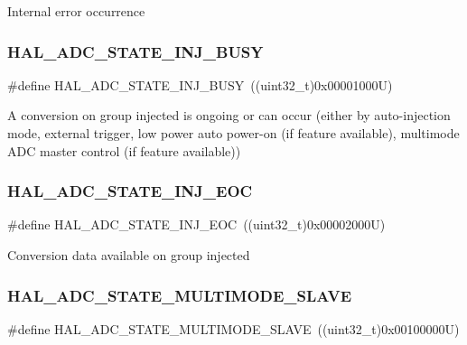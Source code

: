 Internal error occurrence \mbox{\label{group___a_d_c___exported___types_ga0044d240de80a70923b5c970d19ba24b}} 
\subsubsection{\texorpdfstring{HAL\_ADC\_STATE\_INJ\_BUSY}{HAL\_ADC\_STATE\_INJ\_BUSY}}
{\footnotesize\ttfamily \#define H\+A\+L\+\_\+\+A\+D\+C\+\_\+\+S\+T\+A\+T\+E\+\_\+\+I\+N\+J\+\_\+\+B\+U\+SY~((uint32\+\_\+t)0x00001000\+U)}

A conversion on group injected is ongoing or can occur (either by auto-\/injection mode, external trigger, low power auto power-\/on (if feature available), multimode A\+DC master control (if feature available)) \mbox{\label{group___a_d_c___exported___types_gafcfffd11ab8b84d3b0a1ce50ccf821d5}} 
\subsubsection{\texorpdfstring{HAL\_ADC\_STATE\_INJ\_EOC}{HAL\_ADC\_STATE\_INJ\_EOC}}
{\footnotesize\ttfamily \#define H\+A\+L\+\_\+\+A\+D\+C\+\_\+\+S\+T\+A\+T\+E\+\_\+\+I\+N\+J\+\_\+\+E\+OC~((uint32\+\_\+t)0x00002000\+U)}

Conversion data available on group injected \mbox{\label{group___a_d_c___exported___types_ga24f867061abe6ee31227ec21289c69db}} 
\subsubsection{\texorpdfstring{HAL\_ADC\_STATE\_MULTIMODE\_SLAVE}{HAL\_ADC\_STATE\_MULTIMODE\_SLAVE}}
{\footnotesize\ttfamily \#define H\+A\+L\+\_\+\+A\+D\+C\+\_\+\+S\+T\+A\+T\+E\+\_\+\+M\+U\+L\+T\+I\+M\+O\+D\+E\+\_\+\+S\+L\+A\+VE~((uint32\+\_\+t)0x00100000\+U)}

